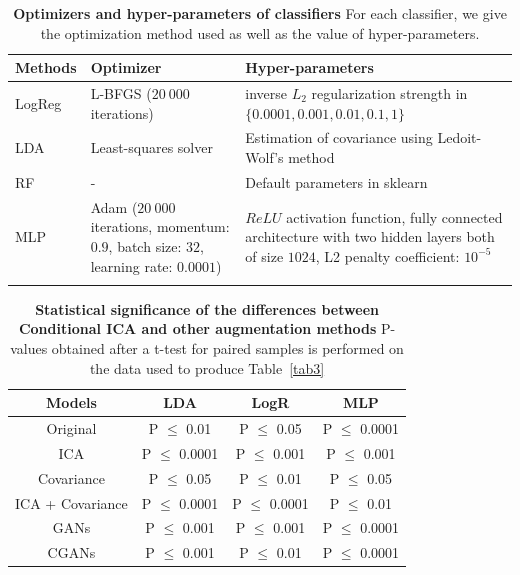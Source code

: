 \begin{center}
  \begin{longtable}{ p{} | p{} |p{}}
\hline
  Methods & Optimizer & Hyper-parameters \\
  \hline
LogReg & L-BFGS \newline ($20~000$ iterations) & inverse $L_2$ regularization
strength \newline in $\{0.0001, 0.001, 0.01, 0.1, 1 \}$ \\
  \hline
LDA  & Least-squares solver & Estimation of covariance \newline using Ledoit-Wolf's
                              method \\
  \hline
  RF &  - &  Default parameters in sklearn \\
  \hline
MLP  & Adam \newline ($20~000$ iterations, \newline momentum: $0.9$, \newline
batch size: $32$, \newline learning
       rate: $0.0001$) & $ReLU$ activation function, fully connected
                         architecture with two hidden layers both of size $1024$, L2
                         penalty coefficient: $10^{-5}$ \\
\hline \hline
\caption{\textbf{Optimizers and hyper-parameters of classifiers} For each classifier, we give the optimization method used as well as the value of hyper-parameters.}\label{app:classifiers:tab} 
\end{longtable}
 
\end{center}

\begin{table}
\begin{center}
\begin{tabular}{c|c|c|c}
\hline
Models & LDA  & LogR & MLP
\\ \hline
Original & P $\leq$ 0.01 & P $\leq$ 0.05 & P $\leq$ 0.0001 \\
 ICA & P $\leq$ 0.0001 & P $\leq$ 0.001 & P $\leq$ 0.001 \\
Covariance & P $\leq$ 0.05 & P $\leq$ 0.01 & P $\leq$ 0.05 \\
ICA + Covariance & P $\leq$ 0.0001 & P $\leq$ 0.0001 & P $\leq$ 0.01 \\
GANs & P $\leq$ 0.001 & P $\leq$ 0.001 & P $\leq$ 0.0001 \\
CGANs & P $\leq$ 0.001 & P $\leq$ 0.01 & P $\leq$ 0.0001 \\
\hline\hline
\end{tabular}
\end{center}
\caption{\textbf{Statistical significance of the differences between Conditional ICA and other augmentation methods} P-values obtained after a t-test for paired samples is performed on the data used to produce Table~\ref{tab3}}\label{app:significance}
\end{table}

